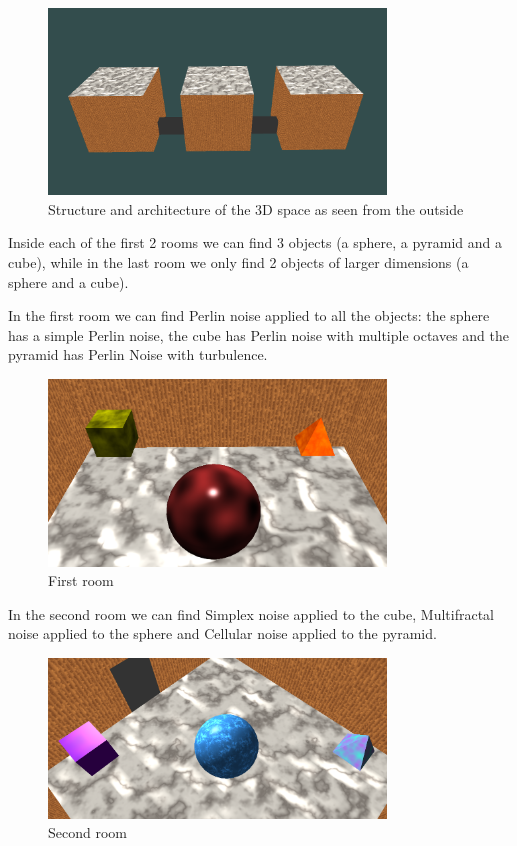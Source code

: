 \documentclass[12pt]{article}
\begin{document}
\begin{figure}[H]
    \centering
    \includegraphics[width=0.8\textwidth]{Images/architecture.png}
    \caption{Structure and architecture of the 3D space as seen from the outside}
\end{figure}

Inside each of the first 2 rooms we can find 3 objects (a sphere, a pyramid and a cube), while in the last room we only find 2 objects of larger dimensions (a sphere and a cube). 
\newline

In the first room we can find Perlin noise applied to all the objects: the sphere has a simple Perlin noise, the cube has Perlin noise with multiple octaves and the pyramid has Perlin Noise with turbulence.
\begin{figure}[H]
    \centering
    \includegraphics[width=0.8\textwidth]{Images/firstRoom.png}

    \caption{First room}
\end{figure}

In the second room we can find Simplex noise applied to the cube, Multifractal noise applied to the sphere and Cellular noise applied to the pyramid.
\begin{figure}[H]
    \centering
    \includegraphics[width=0.8\textwidth]{Images/secondRoom.png}
    \caption{Second room}
\end{figure}
\end{document}
